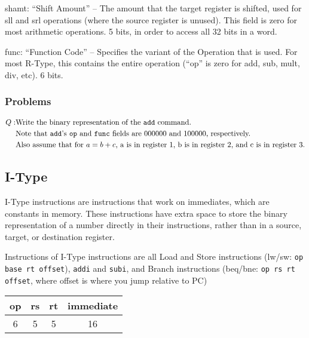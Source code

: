 \documentclass{article}
\begin{document}
shamt: ``Shift Amount'' -- The amount that the target register is shifted, used for sll and srl operations (where the source register is unused). This field is zero for most arithmetic operations. 5 bits, in order to access all 32 bits in a word.

func: ``Function Code'' -- Specifies the variant of the Operation that is used. For most R-Type, this contains the entire operation (``op'' is zero for add, sub, mult, div, etc). 6 bits.

\subsubsection{Problems}\label{RTypeProblems}

\begin{equation}\label{RType1}
\begin{aligned}
    Q: & \text{Write the binary representation of the \texttt{add} command.}\\
    & \text{Note that \texttt{add}'s \texttt{op} and \texttt{func} fields are 000000 and 100000, respectively.}\\
    & \text{Also assume that for } a = b + c \text{, a is in register 1, b is in register 2, and c is in register 3.}
\end{aligned}
\end{equation}

\subsection{I-Type}\label{IType}

I-Type instructions are instructions that work on immediates, which are constants in memory. These instructions have extra space to store the binary representation of a number directly in their instructions, rather than in a source, target, or destination register. 

Instructions of I-Type instructions are all Load and Store instructions (lw/sw: \texttt{op base rt offset}), \texttt{addi} and \texttt{subi}, and Branch instructions (beq/bne: \texttt{op rs rt offset}, where offset is where you jump relative to PC)

\begin{tabular}{| c | c | c | c |}
    \hline
        op & rs & rt & immediate \\
        \hline
        6 & 5 & 5 & 16 \\
    \hline
\end{tabular}
\end{document}

